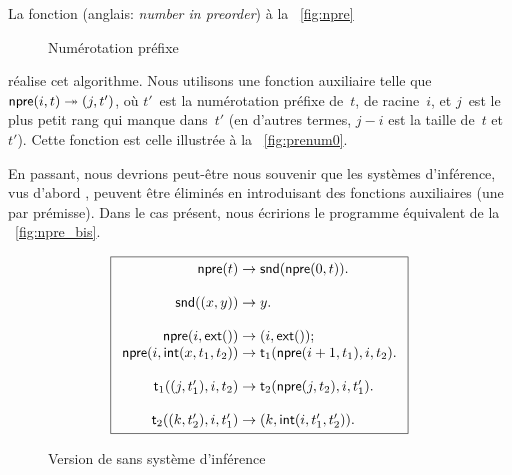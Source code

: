 La fonction  (anglais:
\emph{number in preorder}) à la \fig~\vref{fig:npre}
\begin{figure}[t]
\abovedisplayskip=0pt
\belowdisplayskip=0pt
\centering
{}
\caption{Numérotation préfixe}
\label{fig:npre}
\end{figure}
réalise cet algorithme. Nous utilisons une fonction auxiliaire
 telle que \(\textsf{npre}(i,t)
\twoheadrightarrow ({j},{t'})\), où \(t'\)~est la numérotation
préfixe de~\(t\), de racine~\(i\), et \(j\)~est le plus petit rang qui
manque dans~\(t'\) (en d'autres termes, \(j-i\) est la taille de~\(t\)
et~\(t'\)). Cette fonction est celle illustrée à la
\fig~\vref{fig:prenum0}.

En passant, nous devrions peut-être nous souvenir que les systèmes
d'inférence, vus d'abord
, peuvent être éliminés en introduisant des
fonctions auxiliaires (une par prémisse). Dans le cas présent, nous
écririons le programme équivalent de la
\fig~\vref{fig:npre_bis}.
\begin{figure}
\begin{equation*}
\boxed{
\begin{array}{r@{\;}c@{\;}l}
\fun{npre}(t) & \rightarrow & \fun{snd}(\fun{npre}(0,t)).\\
\\
\fun{snd}(\pair{x}{y}) & \rightarrow & y.\\
\\
\fun{npre}(i,\fun{ext}()) & \rightarrow & \pair{i}{\fun{ext}()};\\
\fun{npre}(i,\fun{int}(x,t_1,t_2)) & \rightarrow &
\fun{t}_1(\fun{npre}(i+1,t_1),i,t_2).\\
\\
\fun{t}_1(\pair{j}{t'_1},i,t_2) & \rightarrow &
\fun{t}_2(\fun{npre}(j,t_2),i,t'_1).\\
\\
\fun{t}_2(\pair{k}{t'_2},i,t'_1) & \rightarrow & \pair{k}{\fun{int}(i,t'_1,t'_2)}.
\end{array}
}
\end{equation*}
\caption{Version de  sans système d'inférence}
\label{fig:npre_bis}
\end{figure}

